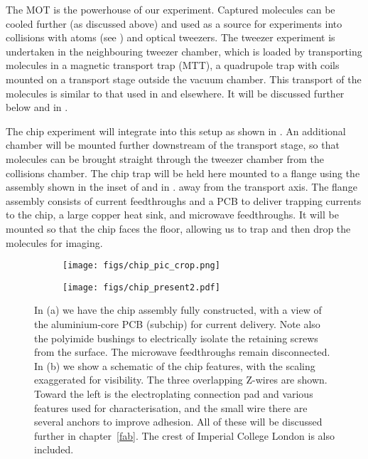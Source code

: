The \CaF{} MOT is the powerhouse of our experiment. Captured molecules can be
cooled further (as discussed above) and used as a source for experiments into
collisions with \Rb{} atoms (see ) and optical tweezers. The tweezer
experiment is undertaken in the neighbouring tweezer chamber, which is loaded
by transporting molecules in a magnetic transport trap (MTT), a quadrupole trap
with coils mounted on a transport stage outside the vacuum chamber. This
transport of the molecules is similar to that used in
 and elsewhere. It will be
discussed further below and in .

The chip experiment will integrate into this setup as shown in
. An additional chamber will be mounted
further downstream of the transport stage, so that molecules can be brought
straight through the tweezer chamber from the collisions chamber. The chip trap
will be held here mounted to a flange using the assembly shown in the inset of
 and in
.
away from the transport axis. The flange assembly consists of current
feedthroughs and a PCB to deliver trapping currents to the chip, a large copper
heat sink, and microwave feedthroughs. It will be mounted so that the chip
faces the floor, allowing us to trap and then drop the molecules for imaging.

\begin{figure}[ht]
  \centering
  \begin{subfigure}[b]{0.45\textwidth}
    \texttt{[image: figs/chip\_pic\_crop.png]}
    \caption{}
  \end{subfigure}
  \hspace{1cm}
  \begin{subfigure}[b]{0.45\textwidth}
    \centering
    \texttt{[image: figs/chip\_present2.pdf]}
    \caption{}
  \end{subfigure}
  \caption{
    In (a) we have the chip assembly fully constructed, with a view of the
    aluminium-core PCB (subchip) for current delivery. Note also the polyimide
    bushings to electrically isolate the retaining screws from the surface. The
    microwave feedthroughs remain disconnected. In (b) we show a schematic of
    the chip features, with the scaling exaggerated for visibility. The three
    overlapping Z-wires are shown. Toward the left is the electroplating
    connection pad and various features used for characterisation, and the small
  wire there are several anchors to improve adhesion. All of these will be
  discussed further in chapter~\ref{fab}. The crest of Imperial College London
is also included.}
  \label{design:fig:chipexperiment}
\end{figure}

